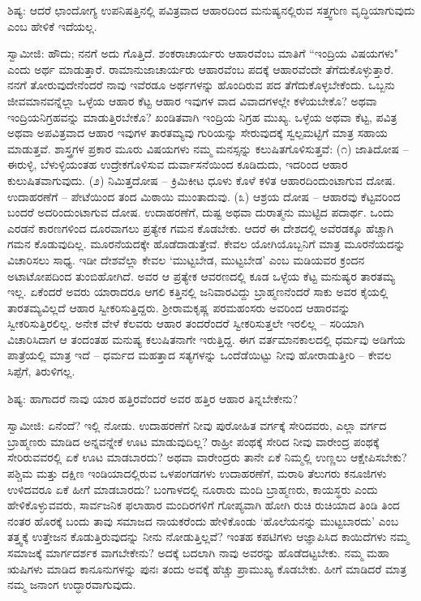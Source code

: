 ಶಿಷ್ಯ: ಆದರೆ ಛಾಂದೋಗ್ಯ ಉಪನಿಷತ್ತಿನಲ್ಲಿ ಪವಿತ್ರವಾದ ಆಹಾರದಿಂದ ಮನುಷ್ಯನಲ್ಲಿರುವ ಸತ್ತ್ವಗುಣ ವೃದ್ಧಿಯಾಗುವುದು ಎಂಬ ಹೇಳಿಕೆ ಇದೆಯಲ್ಲ.

ಸ್ವಾಮೀಜಿ: ಹೌದು; ನನಗೆ ಅದು ಗೊತ್ತಿದೆ. ಶಂಕರಾಚಾರ್ಯರು ಆಹಾರವೆಂಬ ಮಾತಿಗೆ “ಇಂದ್ರಿಯ ವಿಷಯಗಳು" ಎಂದು ಅರ್ಥ ಮಾಡುತ್ತಾರೆ. ರಾಮಾನುಜಾಚಾರ್ಯರು ಆಹಾರವೆಂಬ ಪದಕ್ಕೆ ಆಹಾರವೆಂದೇ ತೆಗೆದುಕೊಳ್ಳುತ್ತಾರೆ. ನನಗೆ ತೋರುವುದೇನೆಂದರೆ ನಾವು ಇವೆರಡೂ ಅರ್ಥಗಳನ್ನು ಹೊಂದಿರುವ ಪದ ತೆಗೆದುಕೊಳ್ಳಬೇಕೆಂದು. ಒಬ್ಬನು ಜೀವಮಾನವನ್ನೆಲ್ಲಾ ಒಳ್ಳೆಯ ಆಹಾರ ಕೆಟ್ಟ ಆಹಾರ ಇವುಗಳ ವಾದ ವಿವಾದಗಳಲ್ಲೇ ಕಳೆಯಬೇಕೊ? ಅಥವಾ ಇಂದ್ರಿಯನಿಗ್ರಹವನ್ನು ಮಾಡುತ್ತಿರಬೇಕೊ? ಖಂಡಿತವಾಗಿ ಇಂದ್ರಿಯ ನಿಗ್ರಹ ಮುಖ್ಯ. ಒಳ್ಳೆಯ ಅಥವಾ ಕೆಟ್ಟ, ಪವಿತ್ರ ಅಥವಾ ಅಪವಿತ್ರವಾದ ಆಹಾರ ಇವುಗಳ ತಾರತಮ್ಯವು ಗುರಿಯನ್ನು ಸೇರುವುದಕ್ಕೆ ಸ್ವಲ್ಪಮಟ್ಟಿಗೆ ಮಾತ್ರ ಸಹಾಯ ಮಾಡುತ್ತವೆ. ಶಾಸ್ತ್ರಗಳ ಪ್ರಕಾರ ಮೂರು ವಿಷಯಗಳು ನಮ್ಮ ಮನಸ್ಸನ್ನು ಕಲುಷಿತಗೊಳಿಸುತ್ತವೆ: (೧) ಜಾತಿದೋಷ – ಈರುಳ್ಳಿ, ಬೆಳುಳ್ಳಿಯಂತಹ ಉದ್ರೇಕಗೊಳಿಸುವ ದುರ್ವಾಸನೆಯಿಂದ ಕೂಡಿದುದು, ಇದರಿಂದ ಆಹಾರ ಕುಲುಷಿತವಾಗುವುದು. (೨) ನಿಮಿತ್ತದೋಷ – ಕ್ರಿಮಿಕೀಟ ಧೂಳು ಕೊಳೆ ಕಳಿತ ಆಹಾರದಿಂದುಂಟಾಗುವ ದೋಷ. ಉದಾಹರಣೆಗೆ – ಪೇಟೆಯಿಂದ ತಂದ ಮಿಠಾಯಿ ಮುಂತಾದುವು. (೩) ಆಶ್ರಯ ದೋಷ – ಆಹಾರವು ಕೆಟ್ಟವರಿಂದ ಬಂದರೆ ಅದರಿಂದುಂಟಾಗುವ ದೋಷ. ಉದಾಹರಣೆಗೆ, ದುಷ್ಟ ಅಥವಾ ದುರಾತ್ಮನು ಮುಟ್ಟಿದ ಪದಾರ್ಥ. ಒಂದು ಎರಡನೆ ಕಾರಣಗಳಿಂದ ದೂರವಾಗಲು ಪ್ರತ್ಯೇಕ ಗಮನ ಕೊಡಬೇಕು. ಆದರೆ ಈ ದೇಶದಲ್ಲಿ ಅವೆರಡಕ್ಕೂ ಹೆಚ್ಚಾಗಿ ಗಮನ ಕೊಡುವುದಿಲ್ಲ. ಮೂರನೆಯದಕ್ಕೇ ಹೊಡೆದಾಡುತ್ತೇವೆ. ಕೇವಲ ಯೋಗಿಯೊಬ್ಬನಿಗೆ ಮಾತ್ರ ಮೂರನೆಯದನ್ನು ವಿಚಾರಿಸಲು ಸಾಧ್ಯ. ಇಡೀ ದೇಶವೆಲ್ಲಾ ಕೇವಲ ‘ಮುಟ್ಟಬೇಡ, ಮುಟ್ಟಬೇಡ’ ಎಂಬ ಮಡಿಯವರ ಕ್ರಂದನ ಅಟಾಟೋಪದಿಂದ ತುಂಬಿಹೋಗಿದೆ. ಅವರ ಆ ಪ್ರತ್ಯೇಕ ಆವರಣದಲ್ಲಿ ಕೂಡ ಒಳ್ಳೆಯ ಕೆಟ್ಟ ಮನುಷ್ಯರ ತಾರತಮ್ಯ ಇಲ್ಲ. ಏಕೆಂದರೆ ಅವರು ಯಾರಾದರೂ ಆಗಲಿ ಕತ್ತಿನಲ್ಲಿ ಜನಿವಾರವಿದ್ದು ಬ್ರಾಹ್ಮಣನೆಂದರೆ ಸಾಕು ಅವರ ಕೈಯಲ್ಲಿ ತಾರತಮ್ಯವಿಲ್ಲದೆ ಆಹಾರ ಸ್ವೀಕರಿಸುತ್ತಿದ್ದರು. ಶ‍್ರೀರಾಮಕೃಷ್ಣ ಪರಮಹಂಸರು ಅವರಿಂದ ಆಹಾರವನ್ನು ಸ್ವೀಕರಿಸುತ್ತಿರಲಿಲ್ಲ. ಅನೇಕ ವೇಳೆ ಕೆಲವರು ಆಹಾರ ತಂದರೆಂದರೆ ಸ್ವೀಕರಿಸುತ್ತಲೇ ಇರಲಿಲ್ಲ – ಸರಿಯಾಗಿ ವಿಚಾರಿಸಿದಾಗ ಆ ತಂದಂತಹ ಮನುಷ್ಯ ಕಲುಷಿತನಾಗೇ ಇರುತ್ತಿದ್ದ. ಈಗ ವರ್ತಮಾನಕಾಲದಲ್ಲಿ ಧರ್ಮವು ಅಡಿಗೆಯ ಪಾತ್ರೆಯಲ್ಲಿ ಮಾತ್ರ ಇದೆ – ಧರ್ಮದ ಮಹತ್ತಾದ ಸತ್ಯಗಳನ್ನು ಒಂದೆಡೆಯಿಟ್ಟು ನೀವು ಹೋರಾಡುತ್ತೀರಿ – ಕೇವಲ ಸಿಪ್ಪೆಗೆ, ತಿರುಳಿಗಲ್ಲ.

ಶಿಷ್ಯ: ಹಾಗಾದರೆ ನಾವು ಯಾರ ಹತ್ತಿರವೆಂದರೆ ಅವರ ಹತ್ತಿರ ಆಹಾರ ತಿನ್ನಬೇಕೇನು?

ಸ್ವಾಮೀಜಿ: ಏನೆಂದೆ? ಇಲ್ಲಿ ನೋಡು. ಉದಾಹರಣೆಗೆ ನೀವು ಪುರೋಹಿತ ವರ್ಗಕ್ಕೆ ಸೇರಿದವರು, ಎಲ್ಲಾ ವರ್ಗದ ಬ್ರಾಹ್ಮಣರು ಮಾಡಿದ ಅನ್ನವನ್ನೇಕೆ ಊಟ ಮಾಡುವುದಿಲ್ಲ? ರಾಹ್ರೀ ಪಂಥಕ್ಕೆ ಸೇರಿದ ನೀವು ವಾರೇಂದ್ರ ಪಂಥಕ್ಕೆ ಸೇರಿರುವವರಲ್ಲಿ ಏಕೆ ಊಟ ಮಾಡಬಾರದು? ಅಥವಾ ವಾರೇಂದ್ರರು ತಾನೇ ಏಕೆ ನಿಮ್ಮಲ್ಲಿ ಉಣ್ಣಲು ಆಕ್ಷೇಪಿಸಬೇಕು? ಪಶ್ಚಿಮ ಮತ್ತು ದಕ್ಷಿಣ ಇಂಡಿಯಾದಲ್ಲಿರುವ ಒಳಪಂಗಡಗಳು ಉದಾಹರಣೆಗೆ, ಮರಾಠಿ ತೆಲುಗರು ಕನೂಜಿಗಳು ಉಳಿದವರೂ ಏಕೆ ಹೀಗೆ ಮಾಡಬಾರದು? ಬಂಗಾಳದಲ್ಲಿ ನೂರಾರು ಮಂದಿ ಬ್ರಾಹ್ಮಣರು, ಕಾಯಸ್ಥರು ಎಂದು ಹೇಳಿಕೊಳ್ಳುವವರು, ಸಾರ್ವಜನಿಕ ಫಲಾಹಾರ ಮಂದಿರಗಳಿಗೆ ಗೋಪ್ಯವಾಗಿ ಹೋಗಿ ರುಚಿ ರುಚಿಯಾದ ತಿಂಡಿ ತಿಂದ ನಂತರ ಹೊರಕ್ಕೆ ಬಂದು ತಾವು ಸಮಾಜದ ನಾಯಕರೆಂದು ಹೇಳಿಕೊಂಡು ‘ಹೊಲೆಯನನ್ನು ಮುಟ್ಟಬಾರದು’ ಎಂಬ ತತ್ತ್ವಕ್ಕೆ ಉತ್ತೇಜನ ಕೊಡುತ್ತಿರುವುದನ್ನು ನೀನು ನೋಡುತ್ತಿಲ್ಲವೆ? ಇಂತಹ ಕಪಟಿಗಳು ಆಜ್ಞಾಪಿಸಿದ ಕಾಯಿದೆಗಳು ನಮ್ಮ ಸಮಾಜಕ್ಕೆ ಮಾರ್ಗದರ್ಶಕ ವಾಗಬೇಕೇನು? ಅದಕ್ಕೆ ಬದಲಾಗಿ ನಾವು ಅವರನ್ನು ಹೊಡೆದಟ್ಟಬೇಕು. ನಮ್ಮ ಮಹಾ ಋಷಿಗಳು ಮಾಡಿದ ಕಾನೂನುಗಳನ್ನು ಪುನಃ ತಂದು ಅವಕ್ಕೆ ಹೆಚ್ಚು ಪ್ರಾಮುಖ್ಯ ಕೊಡಬೇಕು. ಹೀಗೆ ಮಾಡಿದರೆ ಮಾತ್ರ ನಮ್ಮ ಜನಾಂಗ ಉದ್ಧಾರವಾಗುವುದು.

